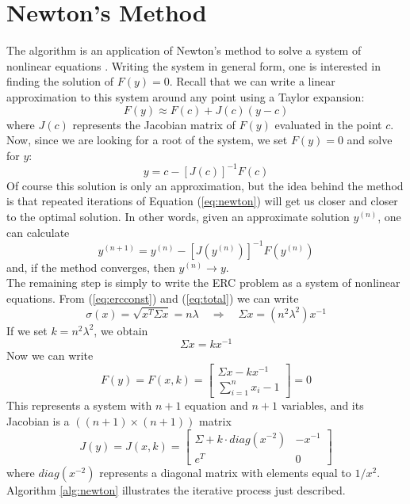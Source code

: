 \section{Newton's Method}
The algorithm is an application of Newton’s method to solve a system of nonlinear equations \cite{newton}. Writing the system in general form, one is interested in finding the solution of $F(y)=0$. Recall that we can write a linear approximation to this system around any point using a Taylor expansion:
\begin{equation}
F(y) \approx F(c) + J(c)(y-c)
\end{equation}
where $J(c)$ represents the Jacobian matrix of $F(y)$ evaluated in the point $c$. Now, since we are looking for a root of the system, we set $F(y) = 0$ and solve for $y$:
\begin{equation}\label{eq:newton}
y = c - [J(c)]^{-1}F(c)
\end{equation}
Of course this solution is only an approximation, but the idea behind the method is that repeated iterations of Equation (\ref{eq:newton}) will get us closer and closer to the optimal solution. In other words, given an approximate solution $y^{(n)}$, one can calculate
\begin{equation}
y^{(n+1)} = y^{(n)} - [J(y^{(n)})]^{-1}F(y^{(n)})
\end{equation}
and, if the method converges, then $y^{(n)}\rightarrow y$.\\
The remaining step is simply to write the ERC problem as a system of nonlinear equations. From (\ref{eq:ercconst}) and (\ref{eq:total}) we can write
\begin{equation}
\sigma(x) = \sqrt{x^T \Sigma x} = n\lambda \hspace{1em} \Rightarrow \hspace{1em} \Sigma x = (n^2\lambda^2)x^{-1}
\end{equation}
If we set $k=n^2\lambda^2$, we obtain
\begin{equation}
\Sigma x = k x^{-1}
\end{equation}
Now we can write
\begin{equation}
F(y) = F(x, k)= \begin{bmatrix}
    \Sigma x - kx^{-1}\\
    \sum_{i=1}^n x_i - 1
\end{bmatrix} = 0
\end{equation}
This represents a system with $n+1$ equation and $n+1$ variables, and its Jacobian is a $((n+1)\times(n+1))$ matrix
\begin{equation}
J(y) = J(x,k) = \begin{bmatrix}
    \Sigma + k\cdot diag(x^{-2}) & -x^{-1}\\
    e^T & 0
\end{bmatrix}
\end{equation}
where $diag(x^{-2})$ represents a diagonal matrix with elements equal to $1/x^2$. Algorithm \ref{alg:newton} illustrates the iterative process just described.

